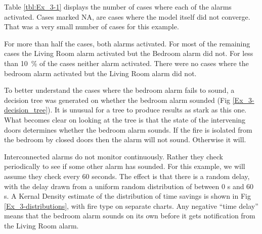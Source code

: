 \documentclass[12pt,twoside]{book}
\begin{document}
Table \ref{tbl:Ex_3-1} displays the number of cases where each of the alarms activated. Cases marked NA, are cases where the model itself did not converge. That was a very small number of cases for this example.

For more than half the cases, both alarms activated. For most of the remaining cases the Living Room alarm activated but the Bedroom alarm did not. For less than 10~\% of the cases neither alarm activated. There were no cases where the bedroom alarm activated but the Living Room alarm did not.

To better understand the cases where the bedroom alarm fails to sound, a decision tree was generated on whether the bedroom alarm sounded (Fig \ref{Ex_3-decision_tree}). It is unusual for a tree to produce results as stark as this one. What becomes clear on looking at the tree is that the state of the intervening doors determines whether the bedroom alarm sounds. If the fire is isolated from the bedroom by closed doors then the alarm will not sound. Otherwise it will.

Interconnected alarms do not monitor continuously. Rather they check periodically to see if some other alarm has sounded. For this example, we will assume they check every 60 seconds. The effect is that there is a random delay, with the delay drawn from a uniform random distribution of between 0 s and 60 s. A Kernal Density estimate of the distribution of time savings is shown in Fig \ref{Ex_3-distributions}, with fire type on separate charts. Any negative ``time delay'' means that the bedroom alarm sounds on its own before it gets notification from the Living Room alarm.
\end{document}
